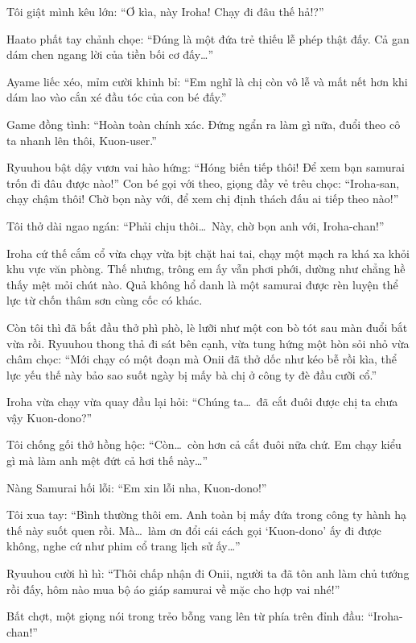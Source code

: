 \documentclass[../main.tex]{subfiles}
\begin{document}

Tôi giật mình kêu lớn: ``Ơ kìa, này Iroha! Chạy đi đâu thế hả!?''

Haato phất tay chảnh chọe: ``Đúng là một đứa trẻ thiếu lễ phép thật đấy. Cả gan dám chen ngang lời của tiền bối cơ đấy\dots''

Ayame liếc xéo, mỉm cười khinh bỉ: ``Em nghĩ là chị còn vô lễ và mất nết hơn khi dám lao vào cắn xé đầu tóc của con bé đấy.''

Game đồng tình: ``Hoàn toàn chính xác. Đứng ngẩn ra làm gì nữa, đuổi theo cô ta nhanh lên thôi, Kuon-user.''

Ryuuhou bật dậy vươn vai hào hứng: ``Hóng biến tiếp thôi! Để xem bạn samurai trốn đi đâu được nào!'' Con bé gọi với theo, giọng đầy vẻ trêu chọc: ``Iroha-san, chạy chậm thôi! Chờ bọn này với, để xem chị định thách đấu ai tiếp theo nào!''

Tôi thở dài ngao ngán: ``Phải chịu thôi\dots\ Này, chờ bọn anh với, Iroha-chan!''

\ct

Iroha cứ thế cắm cổ vừa chạy vừa bịt chặt hai tai, chạy một mạch ra khá xa khỏi khu vực văn phòng. Thế nhưng, trông em ấy vẫn phơi phới, dường như chẳng hề thấy mệt mỏi chút nào. Quả không hổ danh là một samurai được rèn luyện thể lực từ chốn thâm sơn cùng cốc có khác.

Còn tôi thì đã bắt đầu thở phì phò, lè lưỡi như một con bò tót sau màn đuổi bắt vừa rồi. Ryuuhou thong thả đi sát bên cạnh, vừa tung hứng một hòn sỏi nhỏ vừa châm chọc: ``Mới chạy có một đoạn mà Onii đã thở dốc như kéo bễ rồi kìa, thể lực yếu thế này bảo sao suốt ngày bị mấy bà chị ở công ty đè đầu cưỡi cổ.''

Iroha vừa chạy vừa quay đầu lại hỏi: ``Chúng ta\dots\ đã cắt đuôi được chị ta chưa vậy Kuon-dono?''

Tôi chống gối thở hồng hộc: ``Còn\dots\ còn hơn cả cắt đuôi nữa chứ. Em chạy kiểu gì mà làm anh mệt đứt cả hơi thế này\dots''

Nàng Samurai hối lỗi: ``Em xin lỗi nha, Kuon-dono!''

Tôi xua tay: ``Bình thường thôi em. Anh toàn bị mấy đứa trong công ty hành hạ thế này suốt quen rồi. Mà\dots\ làm ơn đổi cái cách gọi `Kuon-dono' ấy đi được không, nghe cứ như phim cổ trang lịch sử ấy\dots''

Ryuuhou cười hì hì: ``Thôi chấp nhận đi Onii, người ta đã tôn anh làm chủ tướng rồi đấy, hôm nào mua bộ áo giáp samurai về mặc cho hợp vai nhé!''

Bất chợt, một giọng nói trong trẻo bỗng vang lên từ phía trên đỉnh đầu: ``Iroha-chan!''
\end{document}
